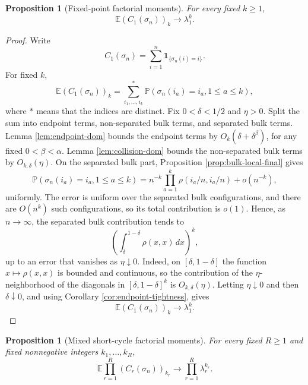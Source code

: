 \documentclass[11pt]{article}
\newtheorem{proposition}[theorem]{Proposition}
\theoremstyle{remark}
\newcommand{\Pp}{\mathbb P}
\newcommand{\Ee}{\mathbb E}
\newcommand{\one}{\mathbf 1}
\newcommand{\dd}{\,d}
\begin{document}
\begin{proposition}[Fixed-point factorial moments]\label{prop:regular-fixed-factorial}
For every fixed \(k\ge1\),
\[
        \Ee(C_1(\sigma_n))_k\to \lambda_1^k.
\]
\end{proposition}

\begin{proof}
Write
\[
        C_1(\sigma_n)=\sum_{i=1}^n\one_{\{\sigma_n(i)=i\}}.
\]
For fixed \(k\),
\[
        \Ee(C_1(\sigma_n))_k
        =\sum_{i_1,\ldots,i_k}^{*}
        \Pp(\sigma_n(i_a)=i_a,1\le a\le k),
\]
where \(*\) means that the indices are distinct.  Fix \(0<\delta<1/2\) and \(\eta>0\).  Split the sum into endpoint terms, non-separated bulk terms, and separated bulk terms.  Lemma \ref{lem:endpoint-dom} bounds the endpoint terms by \(O_k(\delta+\delta^\beta)\), for any fixed \(0<\beta<\alpha\).  Lemma \ref{lem:collision-dom} bounds the non-separated bulk terms by \(O_{k,\delta}(\eta)\).  On the separated bulk part, Proposition \ref{prop:bulk-local-final} gives
\[
        \Pp(\sigma_n(i_a)=i_a,1\le a\le k)
        =n^{-k}\prod_{a=1}^k\rho(i_a/n,i_a/n)+o(n^{-k}),
\]
uniformly.  The error is uniform over the separated bulk configurations, and there are \(O(n^k)\) such configurations, so its total contribution is \(o(1)\).  Hence, as \(n\to\infty\), the separated bulk contribution tends to
\[
        \left(\int_\delta^{1-\delta}\rho(x,x)\dd x\right)^k,
\]
up to an error that vanishes as \(\eta\downarrow0\).  Indeed, on \([\delta,1-\delta]\) the function \(x\mapsto\rho(x,x)\) is bounded and continuous, so the contribution of the \(\eta\)-neighborhood of the diagonals in \([\delta,1-\delta]^k\) is \(O_{k,\delta}(\eta)\).  Letting \(\eta\downarrow0\) and then \(\delta\downarrow0\), and using Corollary \ref{cor:endpoint-tightness}, gives
\[
        \Ee(C_1(\sigma_n))_k\to \lambda_1^k.
\]
\end{proof}

\begin{proposition}[Mixed short-cycle factorial moments]\label{prop:regular-cycle-factorial}
For every fixed \(R\ge1\) and fixed nonnegative integers \(k_1,\ldots,k_R\),
\[
        \Ee\prod_{r=1}^R(C_r(\sigma_n))_{k_r}
        \to \prod_{r=1}^R\lambda_r^{k_r}.
\]
\end{proposition}
\end{document}
